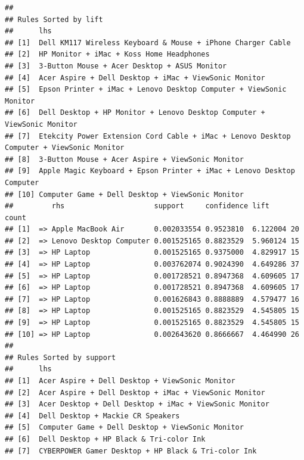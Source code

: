 \documentclass[]{article}
\begin{document}
\begin{verbatim}
## 
## Rules Sorted by lift 
##      lhs                                                                                     
## [1]  Dell KM117 Wireless Keyboard & Mouse + iPhone Charger Cable                             
## [2]  HP Monitor + iMac + Koss Home Headphones                                                
## [3]  3-Button Mouse + Acer Desktop + ASUS Monitor                                            
## [4]  Acer Aspire + Dell Desktop + iMac + ViewSonic Monitor                                   
## [5]  Epson Printer + iMac + Lenovo Desktop Computer + ViewSonic Monitor                      
## [6]  Dell Desktop + HP Monitor + Lenovo Desktop Computer + ViewSonic Monitor                 
## [7]  Etekcity Power Extension Cord Cable + iMac + Lenovo Desktop Computer + ViewSonic Monitor
## [8]  3-Button Mouse + Acer Aspire + ViewSonic Monitor                                        
## [9]  Apple Magic Keyboard + Epson Printer + iMac + Lenovo Desktop Computer                   
## [10] Computer Game + Dell Desktop + ViewSonic Monitor                                        
##         rhs                     support     confidence lift     count
## [1]  => Apple MacBook Air       0.002033554 0.9523810  6.122004 20   
## [2]  => Lenovo Desktop Computer 0.001525165 0.8823529  5.960124 15   
## [3]  => HP Laptop               0.001525165 0.9375000  4.829917 15   
## [4]  => HP Laptop               0.003762074 0.9024390  4.649286 37   
## [5]  => HP Laptop               0.001728521 0.8947368  4.609605 17   
## [6]  => HP Laptop               0.001728521 0.8947368  4.609605 17   
## [7]  => HP Laptop               0.001626843 0.8888889  4.579477 16   
## [8]  => HP Laptop               0.001525165 0.8823529  4.545805 15   
## [9]  => HP Laptop               0.001525165 0.8823529  4.545805 15   
## [10] => HP Laptop               0.002643620 0.8666667  4.464990 26   
## 
## Rules Sorted by support 
##      lhs                                                                         
## [1]  Acer Aspire + Dell Desktop + ViewSonic Monitor                              
## [2]  Acer Aspire + Dell Desktop + iMac + ViewSonic Monitor                       
## [3]  Acer Desktop + Dell Desktop + iMac + ViewSonic Monitor                      
## [4]  Dell Desktop + Mackie CR Speakers                                           
## [5]  Computer Game + Dell Desktop + ViewSonic Monitor                            
## [6]  Dell Desktop + HP Black & Tri-color Ink                                     
## [7]  CYBERPOWER Gamer Desktop + HP Black & Tri-color Ink                         

\end{verbatim}
\end{document}
